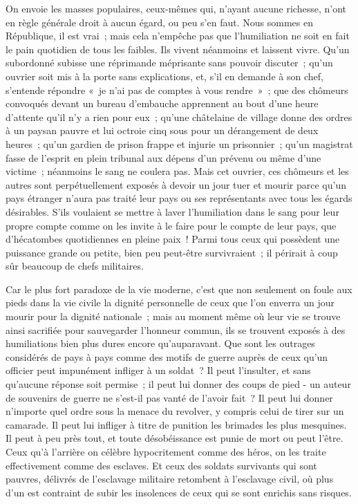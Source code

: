 \documentclass[french,twoside]{book} %
\begin{document}
On envoie les masses populaires, ceux-mêmes qui, n'ayant aucune ri­chesse, n'ont en règle générale droit à aucun égard, ou peu s'en faut. Nous sommes en République, il est vrai ; mais cela n'empêche pas que l'humiliation ne soit en fait le pain quotidien de tous les faibles. Ils vivent néanmoins et laissent vivre. Qu'un subordonné subisse une réprimande méprisante sans pouvoir discuter ; qu'un ouvrier soit mis à la porte sans explications, et, s'il en demande à son chef, s'entende répondre « je n'ai pas de comptes à vous rendre » ; que des chômeurs convoqués devant un bureau d'embauche apprennent au bout d'une heure d'attente qu'il n'y a rien pour eux ; qu'une châtelaine de village donne des ordres à un paysan pauvre et lui octroie cinq sous pour un dérangement de deux heures ; qu'un gardien de prison frappe et injurie un prisonnier ; qu'un magistrat fasse de l'esprit en plein tribunal aux dépens d'un prévenu ou même d'une victime ; néanmoins le sang ne coulera pas. Mais cet ouvrier, ces chômeurs et les autres sont perpétuellement exposés à devoir un jour tuer et mourir parce qu'un pays étranger n'aura pas traité leur pays ou ses représentants avec tous les égards désirables. S'ils voulaient se mettre à laver l'humiliation dans le sang pour leur propre compte comme on les invite à le faire pour le compte de leur pays, que d'hécatombes quotidien­nes en pleine paix ! Parmi tous ceux qui possèdent une puissance grande ou petite, bien peu peut-être survivraient ; il périrait à coup sûr beaucoup de chefs militaires.\par
Car le plus fort paradoxe de la vie moderne, c'est que non seulement on foule aux pieds dans la vie civile la dignité personnelle de ceux que l'on enverra un jour mourir pour la dignité nationale ; mais au moment même où leur vie se trouve ainsi sacrifiée pour sauvegarder l'honneur commun, ils se trouvent exposés à des humiliations bien plus dures encore qu'auparavant. Que sont les outrages considérés de pays à pays comme des motifs de guerre auprès de ceux qu'un officier peut impunément infliger à un soldat ? Il peut l'insulter, et sans qu'aucune réponse soit permise ; il peut lui donner des coups de pied - un auteur de souvenirs de guerre ne s'est-il pas vanté de l'avoir fait ? Il peut lui donner n'importe quel ordre sous la menace du revolver, y compris celui de tirer sur un camarade. Il peut lui infliger à titre de punition les brimades les plus mesquines. Il peut à peu près tout, et toute désobéissance est punie de mort ou peut l'être. Ceux qu'à l’arrière on célèbre hypocritement comme des héros, on les traite effectivement comme des esclaves. Et ceux des soldats survivants qui sont pauvres, délivrés de l'esclavage militaire retombent à l'esclavage civil, où plus d'un est contraint de subir les insolences de ceux qui se sont enrichis sans risques.\par
\end{document}

